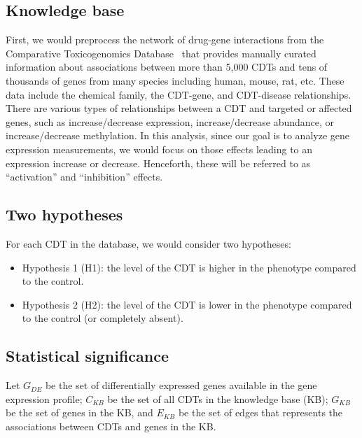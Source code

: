 \subsection{Knowledge base}
First, we would preprocess the network of drug-gene interactions from the Comparative Toxicogenomics Database~\cite{mattingly2006comparative} that provides manually curated information about associations between more than 5,000 CDTs and tens of thousands of genes from many species including human, mouse, rat, etc. These data include the chemical family, the CDT-gene, and CDT-disease relationships.
There are various types of relationships between a CDT and targeted or affected genes, such as increase/decrease expression, increase/decrease abundance, or increase/decrease methylation.
In this analysis, since our goal is to analyze gene expression measurements, we would focus on  those effects leading to an expression increase or decrease. Henceforth, these will be referred to as ``activation'' and ``inhibition'' effects.



\subsection{Two hypotheses}

For each CDT in the database, we would consider two hypotheses:

\begin{itemize}
\item Hypothesis 1 (H1): the level of the CDT is higher in the phenotype compared to the control.%
\item Hypothesis 2 (H2): the level of the CDT  is lower  in the phenotype compared to the control (or completely absent).%
\end{itemize}

\subsection{Statistical significance}


Let $G_{DE}$ be the set of differentially expressed genes available in the gene expression profile; $C_{KB}$ be the set of all CDTs in the knowledge base (KB); $G_{KB}$ be the set of genes in the KB, and $E_{KB}$ be the set of edges that represents the associations between CDTs and genes in the KB. 

